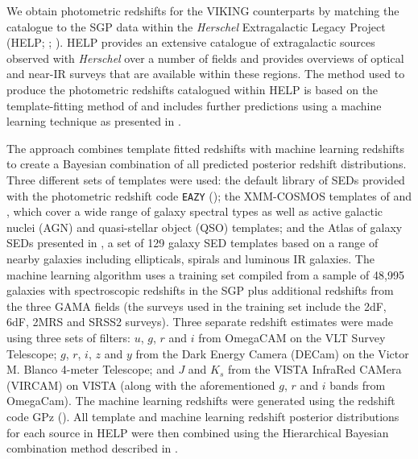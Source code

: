 We obtain photometric redshifts for the VIKING counterparts by matching the catalogue to the SGP data within the \textit{Herschel} Extragalactic Legacy Project (HELP; \citealt{Vaccari_2016}; \citealt{Shirley_2019}). HELP provides an extensive catalogue of extragalactic sources observed with \textit{Herschel} over a number of fields and provides overviews of optical and near-IR surveys that are available within these regions. The method used to produce the photometric redshifts catalogued within HELP is based on the template-fitting method of \citealt{Duncan_2018a} and includes further predictions using a machine learning technique as presented in \citealt{Duncan_2018b}.

The approach combines template fitted redshifts with machine learning redshifts to create a Bayesian combination of all predicted posterior redshift distributions. Three different sets of templates were used: the default library of SEDs provided with the photometric redshift code \texttt{EAZY} (\citealt{Brammer_2008}); the XMM-COSMOS templates of \citealt{Salvato_2009} and \citealt{Salvato_2011}, which cover a wide range of galaxy spectral types as well as active galactic nuclei (AGN) and quasi-stellar object (QSO) templates; and the Atlas of galaxy SEDs presented in \citealt{Brown_2014}, a set of 129 galaxy SED templates based on a range of nearby galaxies including ellipticals, spirals and luminous IR galaxies. The machine learning algorithm uses a training set compiled from a sample of 48,995 galaxies with spectroscopic redshifts in the SGP plus additional redshifts from the three GAMA fields (the surveys used in the training set include the 2dF, 6dF, 2MRS and SRSS2 surveys). Three separate redshift estimates were made using three sets of filters: $u$, $g$, $r$ and $i$ from OmegaCAM on the VLT Survey Telescope; $g$, $r$, $i$, $z$ and $y$ from the Dark Energy Camera (DECam) on the Victor M. Blanco 4-meter Telescope; and $J$ and $K_s$ from the VISTA InfraRed CAMera (VIRCAM) on VISTA (along with the aforementioned $g$, $r$ and $i$ bands from OmegaCam). The machine learning redshifts were generated using the redshift code GPz (\citealt{Almosallam_2016}). All template and machine learning redshift posterior distributions for each source in HELP were then combined using the Hierarchical Bayesian combination method described in \citealt{Dahlen_2013}.

